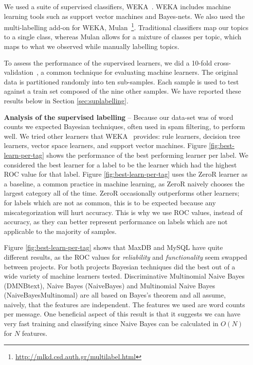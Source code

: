 \documentclass[]{sig-alternate}
\begin{document}
We used a suite of supervised classifiers, WEKA~\cite{weka09}. 
WEKA includes machine learning tools such as support vector machines and Bayes-nets. 
We also used the multi-labelling add-on for WEKA, Mulan~\cite{mulan}\footnote{\url{http://mlkd.csd.auth.gr/multilabel.html}}. 
Traditional classifiers map our topics to a single class, whereas Mulan allows for a mixture of classes per topic, which maps to what we observed while manually labelling topics.

To assess the performance of the supervised learners, we did a 10-fold cross-validation~\cite{Kohavi1995}, a common technique for evaluating machine learners. 
The original data is partitioned randomly into ten sub-samples. Each sample is used to test against a train set composed of the nine other samples.
We have reported these results below in Section \ref{sec:suplabelling}.

\textbf{Analysis of the supervised labelling} -- 
Because our data-set was of word counts we expected Bayesian techniques, often used in spam filtering, to perform well. 
We tried other learners that WEKA~\cite{weka09} provides: rule learners, decision tree learners, vector space learners, and support vector machines.  
Figure \ref{fig:best-learn-per-tag} shows the performance of the best performing learner per label. 
 We considered the best learner for a label to be the learner which had the highest ROC value for that label. 
Figure \ref{fig:best-learn-per-tag} uses the ZeroR learner as a baseline, a common practice in machine learning,
as ZeroR naively chooses the largest category all of the time. 
ZeroR occasionally outperforms other learners; for labels which are not as common, this is to be expected because any miscategorization will hurt accuracy. 
This is why we use ROC values, instead of accuracy, as they can better represent performance on labels which are not applicable to the majority of samples.

Figure \ref{fig:best-learn-per-tag} shows that MaxDB and MySQL have quite different results, as the ROC values for \emph{reliability} and \emph{functionality} seem swapped between projects. 
For both projects Bayesian techniques did the best out of a wide variety of machine learners tested. 
Discriminative Multinomial Naive Bayes (DMNBtext), Naive Bayes (NaiveBayes) and Multinomial Naive Bayes (NaiveBayesMultinomal) are all based on Bayes's theorem and all assume, naively, that the features are independent. 
The features we used are word counts per message. 
One beneficial aspect of this result is that it suggests we can have very fast training and classifying  since Naive Bayes can be calculated in $O(N)$ for $N$ features.
\end{document}
